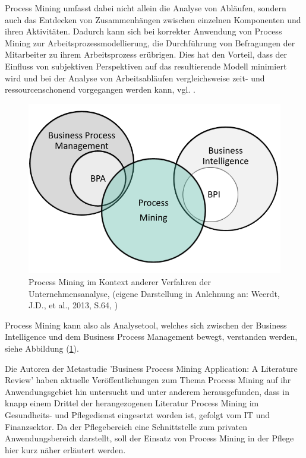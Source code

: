 Process Mining umfasst dabei nicht allein die Analyse von Abläufen, sondern auch das Entdecken von Zusammenhängen zwischen einzelnen Komponenten und ihren Aktivitäten. Dadurch kann sich bei korrekter Anwendung von Process Mining zur Arbeitsprozessmodellierung, die Durchführung von Befragungen der Mitarbeiter zu ihrem Arbeitsprozess erübrigen. Dies hat den Vorteil, dass der Einfluss von subjektiven Perspektiven auf das resultierende Modell minimiert wird und bei der Analyse von Arbeitsabläufen vergleichsweise zeit- und ressourcenschonend vorgegangen werden kann, vgl. \cite{PMinAction}.
\begin{figure}[!ht]
    \centering
    \includegraphics[scale=0.41]{figures/Appbildungen/businessanalytics.PNG}
    \caption{Process Mining im Kontext anderer Verfahren der Unternehmensanalyse,  (eigene Darstellung in Anlehnung an: Weerdt, J.D., et al., 2013, S.64, \cite{DeWeerdt})}
    \label{fig:BIContext}
\end{figure}

Process Mining kann also als Analysetool, welches sich zwischen der Business Intelligence und dem Business Process Management bewegt, verstanden werden, siehe Abbildung (\ref{fig:BIContext}).

Die Autoren der Metastudie 'Business Process Mining Application: A Literature Review' \cite{litreview} haben aktuelle Veröffentlichungen zum Thema Process Mining auf ihr Anwendungsgebiet hin untersucht und unter anderem herausgefunden, dass in knapp einem Drittel der herangezogenen Literatur Process Mining im Gesundheits- und Pflegedienst eingesetzt worden ist, gefolgt vom IT und Finanzsektor. Da der Pflegebereich eine Schnittstelle zum privaten Anwendungsbereich darstellt, soll der Einsatz von Process Mining in der Pflege hier kurz näher erläutert werden.

